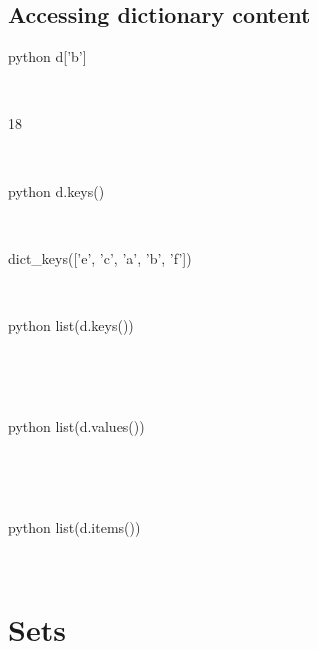 \documentclass[aspectratio=1610,slidestop]{beamer}
\begin{document}
\subsection{Accessing dictionary content}
\begin{pframe}
 \begin{ipython}
  \begin{pythonin}{python}
d['b']
  \end{pythonin}
  \\
  \begin{pythonout}
18
  \end{pythonout}
  \\

  \begin{pythonin}{python}
d.keys()
  \end{pythonin}
  \\
  \begin{pythonout}
dict\_keys(['e', 'c', 'a', 'b', 'f'])
  \end{pythonout}
  \\

  \begin{pythonin}{python}
list(d.keys())
  \end{pythonin}
  \\
  \begin{pythonout}
['a', 'c', 'b', 'e', 'f']
  \end{pythonout}
  \\

  \begin{pythonin}{python}
list(d.values())
  \end{pythonin}
  \\
  \begin{pythonout}
[18, 12, 18, 17, 2]
  \end{pythonout}
  \\

  \begin{pythonin}{python}
list(d.items())
  \end{pythonin}
  \\
  \begin{pythonout}
[('a', 18), ('c', 12), ('b', 18), ('e', 17), ('f', 2)]
  \end{pythonout}
 \end{ipython}
\end{pframe}



\section{Sets}
\end{document}
